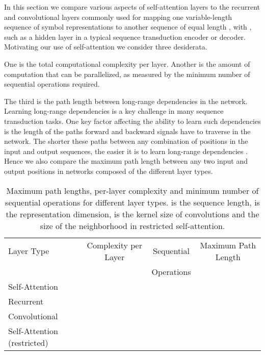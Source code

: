 \documentclass{article}
\begin{document}
In this section we compare various aspects of self-attention layers to the recurrent and convolutional layers commonly used for mapping one variable-length sequence of symbol representations  to another sequence of equal length , with , such as a hidden layer in a typical sequence transduction encoder or decoder. Motivating our use of self-attention we consider three desiderata.

One is the total computational complexity per layer.
Another is the amount of computation that can be parallelized, as measured by the minimum number of sequential operations required.

The third is the path length between long-range dependencies in the network. Learning long-range dependencies is a key challenge in many sequence transduction tasks. One key factor affecting the ability to learn such dependencies is the length of the paths forward and backward signals have to traverse in the network. The shorter these paths between any combination of positions in the input and output sequences, the easier it is to learn long-range dependencies \citep{hochreiter2001gradient}. Hence we also compare the maximum path length between any two input and output positions in networks composed of the different layer types.



\begin{table}[t]
\caption{
  Maximum path lengths, per-layer complexity and minimum number of sequential operations for different layer types.  is the sequence length,  is the representation dimension,  is the kernel size of convolutions and  the size of the neighborhood in restricted self-attention.}
\label{tab:op_complexities}
\begin{center}
\vspace{-1mm}


\begin{tabular}{lccc}
\toprule
Layer Type & Complexity per Layer & Sequential & Maximum Path Length  \\
           &             & Operations &   \\
\hline
\rule{0pt}{2.0ex}Self-Attention &  &  &  \\
Recurrent &  &  &  \\

Convolutional &  &  &  \\
Self-Attention (restricted)&  &  &  \\









\bottomrule
\end{tabular}
\end{center}
\end{table}
\end{document}
